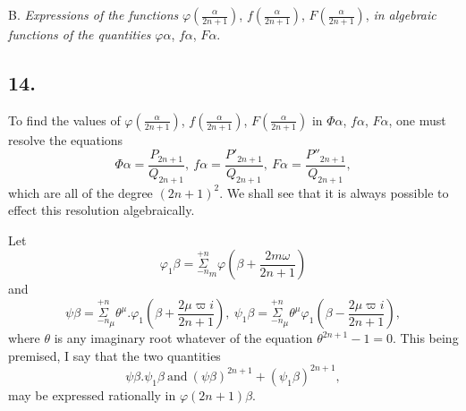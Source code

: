 \documentclass{article}
\begin{document}
B. \emph{Expressions of the functions} $\varphi\left(\frac{\alpha}{2n+1}\right)$, $f\left(\frac{\alpha}{2n+1}\right)$, $F\left(\frac{\alpha}{2n+1}\right)$, \emph{in algebraic functions of the quantities} $\varphi\alpha$, $f\alpha$, $F\alpha$.

\subsection*{14.}

To find the values of $\varphi\left(\frac{\alpha}{2n+1}\right)$, $f\left(\frac{\alpha}{2n+1}\right)$, $F\left(\frac{\alpha}{2n+1}\right)$ in $\Phi\alpha$, $f\alpha$, $F\alpha$, one must resolve the equations
\[ \Phi\alpha=\frac{P_{2n+1}}{Q_{2n+1}},\ f\alpha=\frac{P'_{2n+1}}{Q_{2n+1}},\ F\alpha=\frac{P''_{2n+1}}{Q_{2n+1}}, \]
which are all of the degree $(2n+1)^{2}$. We shall see that it is always possible to effect this resolution algebraically.


Let
\[ \varphi_{1}\beta=\overset{+n}{\underset{-n}{\Sigma}}_{m}\varphi\left(\beta+\frac{2m\omega}{2n+1}\right) \tag{68.} \]
and
\[ \psi\beta=\overset{+n}{\underset{-n}{\Sigma}}_{\mu}\theta^{\mu}.\varphi_{1}\left(\beta+\frac{2\mu\varpi i}{2n+1}\right),\ \psi_{1}\beta=\overset{+n}{\underset{-n}{\Sigma}}_{\mu}\theta^{\mu}\varphi_{1}\left(\beta-\frac{2\mu\varpi i}{2n+1}\right), \tag{69.} \]
where $\theta$ is any imaginary root whatever of the equation $\theta^{2n+1}-1=0$.
This being premised, I say that the two quantities
\[ \psi\beta.\psi_{1}\beta\ \text{and}\ (\psi\beta)^{2n+1}+(\psi_{1}\beta)^{2n+1}, \]
may be expressed rationally in $\varphi(2n+1)\beta$.
\end{document}
